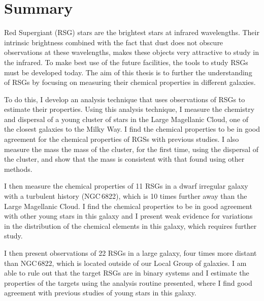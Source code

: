 
\chapter{Summary}
\singlespacing

Red Supergiant (RSG) stars are the brightest stars at infrared wavelengths.
Their intrinsic brightness combined with the fact that dust does not obscure observations at these wavelengths,
makes these objects very attractive to study in the infrared.
To make best use of the future facilities, the tools to study RSGs must be developed today.
The aim of this thesis is to further the understanding of RSGs by focusing on measuring their chemical properties in different galaxies.

To do this, I develop an analysis technique that uses observations of RSGs to estimate their properties.
Using this analysis technique, I measure the chemistry and dispersal of a young cluster of stars in the Large Magellanic Cloud, one of the closest galaxies to the Milky Way. I find the chemical properties to be in good agreement for the chemical properties of RGSs with previous studies.
I also measure the mass the mass of the cluster, for the first time, using the dispersal of the cluster, and show that the mass is consistent with that found using other methods.

I then measure the chemical properties of 11 RSGs in a dwarf irregular galaxy with a turbulent history (NGC\,6822), which is 10 times further away than the Large Magellanic Cloud.
I find the chemical properties to be in good agreement with other young stars in this galaxy and I present weak evidence for variations in the distribution of the chemical elements in this galaxy, which requires further study.

I then present observations of 22 RSGs in a large galaxy, four times more distant than NGC\,6822, which is located outside of our Local Group of galaxies.
I am able to rule out that the target RSGs are in binary systems and I estimate the properties of the targets using the analysis routine presented, where I find good agreement with previous studies of young stars in this galaxy.

